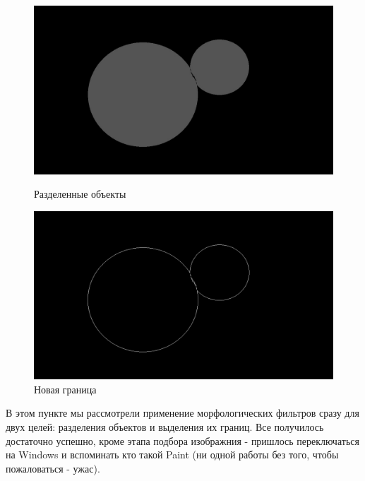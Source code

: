 \begin{figure}[!htb]
    \includegraphics[width=\linewidth]{../img/outputs/divide_objects/img_divided.jpg}
    \caption{Разделенные объекты}
    \endminipage\hfill
    \includegraphics[width=\linewidth]{../img/outputs/divide_objects/borders_divided.jpg}
    \caption{Новая граница}
    \endminipage\hfill
\end{figure}

\noindent В этом пункте мы рассмотрели применение морфологических фильтров сразу для двух целей: разделения объектов и выделения их границ. Все получилось достаточно успешно, кроме этапа подбора изображния - пришлось переключаться на Windows и вспоминать  кто такой Paint (ни одной работы без того, чтобы пожаловаться - ужас).
